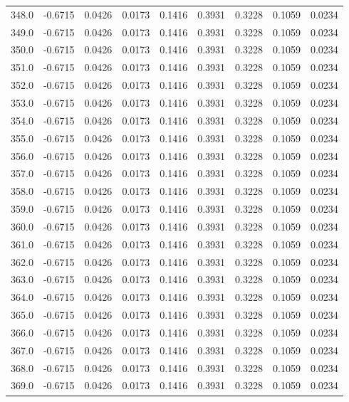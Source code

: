 \begin{longtable}{lrrrrrrrr}
348.0 & -0.6715 & 0.0426 & 0.0173 & 0.1416 & 0.3931 & 0.3228 & 0.1059 & 0.0234 \\
349.0 & -0.6715 & 0.0426 & 0.0173 & 0.1416 & 0.3931 & 0.3228 & 0.1059 & 0.0234 \\
350.0 & -0.6715 & 0.0426 & 0.0173 & 0.1416 & 0.3931 & 0.3228 & 0.1059 & 0.0234 \\
351.0 & -0.6715 & 0.0426 & 0.0173 & 0.1416 & 0.3931 & 0.3228 & 0.1059 & 0.0234 \\
352.0 & -0.6715 & 0.0426 & 0.0173 & 0.1416 & 0.3931 & 0.3228 & 0.1059 & 0.0234 \\
353.0 & -0.6715 & 0.0426 & 0.0173 & 0.1416 & 0.3931 & 0.3228 & 0.1059 & 0.0234 \\
354.0 & -0.6715 & 0.0426 & 0.0173 & 0.1416 & 0.3931 & 0.3228 & 0.1059 & 0.0234 \\
355.0 & -0.6715 & 0.0426 & 0.0173 & 0.1416 & 0.3931 & 0.3228 & 0.1059 & 0.0234 \\
356.0 & -0.6715 & 0.0426 & 0.0173 & 0.1416 & 0.3931 & 0.3228 & 0.1059 & 0.0234 \\
357.0 & -0.6715 & 0.0426 & 0.0173 & 0.1416 & 0.3931 & 0.3228 & 0.1059 & 0.0234 \\
358.0 & -0.6715 & 0.0426 & 0.0173 & 0.1416 & 0.3931 & 0.3228 & 0.1059 & 0.0234 \\
359.0 & -0.6715 & 0.0426 & 0.0173 & 0.1416 & 0.3931 & 0.3228 & 0.1059 & 0.0234 \\
360.0 & -0.6715 & 0.0426 & 0.0173 & 0.1416 & 0.3931 & 0.3228 & 0.1059 & 0.0234 \\
361.0 & -0.6715 & 0.0426 & 0.0173 & 0.1416 & 0.3931 & 0.3228 & 0.1059 & 0.0234 \\
362.0 & -0.6715 & 0.0426 & 0.0173 & 0.1416 & 0.3931 & 0.3228 & 0.1059 & 0.0234 \\
363.0 & -0.6715 & 0.0426 & 0.0173 & 0.1416 & 0.3931 & 0.3228 & 0.1059 & 0.0234 \\
364.0 & -0.6715 & 0.0426 & 0.0173 & 0.1416 & 0.3931 & 0.3228 & 0.1059 & 0.0234 \\
365.0 & -0.6715 & 0.0426 & 0.0173 & 0.1416 & 0.3931 & 0.3228 & 0.1059 & 0.0234 \\
366.0 & -0.6715 & 0.0426 & 0.0173 & 0.1416 & 0.3931 & 0.3228 & 0.1059 & 0.0234 \\
367.0 & -0.6715 & 0.0426 & 0.0173 & 0.1416 & 0.3931 & 0.3228 & 0.1059 & 0.0234 \\
368.0 & -0.6715 & 0.0426 & 0.0173 & 0.1416 & 0.3931 & 0.3228 & 0.1059 & 0.0234 \\
369.0 & -0.6715 & 0.0426 & 0.0173 & 0.1416 & 0.3931 & 0.3228 & 0.1059 & 0.0234 \\

\end{longtable}
